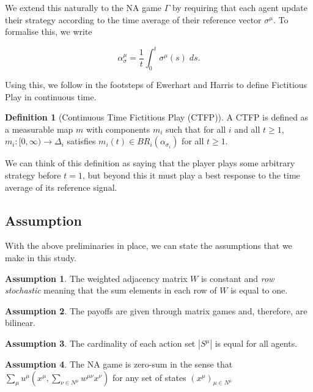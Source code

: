 \documentclass{article}
\theoremstyle{definition}
\newtheorem*{definition}{Definition}
\newtheorem{assumption}{Assumption}
\newcommand{\weightset}{W}
\newcommand{\actionset}[1]{S^{#1}}
\newcommand{\wmunu}{w^{\mu \nu}}
\newcommand{\xmu}{x^{\mu}}
\newcommand{\xnu}{x^{\nu}}
\newcommand{\refmu}{\sigma^{\mu}}
\newcommand{\avgref}[1]{\alpha_\sigma^{#1}}
\newcommand{\weightedsum}{ \sum_{\nu \in N^\mu} \wmunu \xnu}
\begin{document}
	We extend this naturally to the NA game $\Gamma$ by requiring that each agent update their
	strategy according to the time average of their reference vector $\refmu$. To formalise this, we
	write

	\begin{equation}
		\avgref{\mu} = \frac{1}{t} \int_0^t \refmu(s) \; ds.
	\end{equation}

	Using this, we follow in the footsteps of Ewerhart \cite{} and Harris \cite{} to define
	Fictitious Play in continuous time.

	\begin{definition}[Continuous Time Fictitious Play (CTFP)]
		A CTFP is defined as a measurable map $m$ with components $m_i$ such that for all $i$ and all $t \geq 1$, $m_i: [0, \infty) \rightarrow \Delta_i$ satisfies $m_i(t) \in BR_i(\alpha_{\sigma_i})$ for all $t \geq 1$.

		We can think of this definition as saying that the player plays some arbitrary strategy before $t = 1$, but beyond this it must play a best response to the time average of its reference signal.
	\end{definition}

	\subsection{Assumption}

	With the above preliminaries in place, we can state the assumptions that we make in this study.

	\begin{assumption}
		The weighted adjacency matrix $\weightset$ is constant and \emph{row stochastic} meaning
		that the sum elements in each row of $\weightset$ is equal to one.
	\end{assumption}

	\begin{assumption}
		The payoffs are given through matrix games and, therefore, are bilinear.
	\end{assumption}

	\begin{assumption}
		The cardinality of each action set $|\actionset{\mu}|$ is equal for all agents.
	\end{assumption}

	\begin{assumption}
		The NA game is zero-sum in the sense that $\sum_{\mu} u^\mu(\xmu, \weightedsum)$ for any set
		of states $(x^\mu)_{\mu \in N^\mu}$
	\end{assumption}
\end{document}
